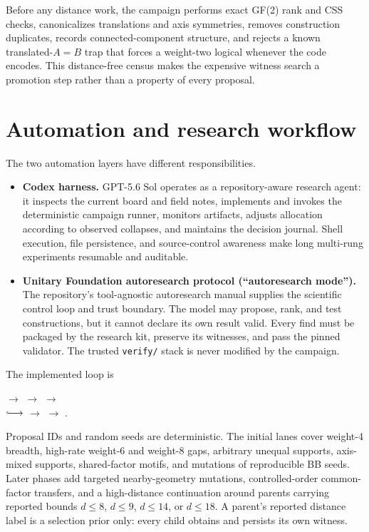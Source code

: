 \documentclass[11pt]{article}
\newcommand{\pathcode}[1]{\nolinkurl{#1}}
\begin{document}
Before any distance work, the campaign performs exact GF(2) rank and CSS
checks, canonicalizes translations and axis symmetries, removes construction
duplicates, records connected-component structure, and rejects a known
translated-$A=B$ trap that forces a weight-two logical whenever the code
encodes.  This distance-free census makes the expensive witness search a
promotion step rather than a property of every proposal.

\section{Automation and research workflow}

The two automation layers have different responsibilities.

\begin{itemize}
  \item \textbf{Codex harness.}  GPT-5.6 Sol operates as a repository-aware
  research agent: it inspects the current board and field notes, implements
  and invokes the deterministic campaign runner, monitors artifacts, adjusts
  allocation according to observed collapses, and maintains the decision
  journal.  Shell execution, file persistence, and source-control awareness
  make long multi-rung experiments resumable and auditable.

  \item \textbf{Unitary Foundation autoresearch protocol (``autoresearch
  mode'').}  The repository's tool-agnostic autoresearch manual supplies the
  scientific control loop and trust boundary.  The model may propose, rank,
  and test constructions, but it cannot declare its own result valid.  Every
  find must be packaged by the research kit, preserve its witnesses, and pass
  the pinned validator.  The trusted \pathcode{verify/} stack is never
  modified by the campaign.
\end{itemize}

The implemented loop is
\begin{center}
\small
{} $\longrightarrow$ 
$\longrightarrow$ 
$\longrightarrow$ \\[0.45em]
$\lhook\joinrel\longrightarrow$ 
$\longrightarrow$ 
$\longrightarrow$ .
\end{center}

Proposal IDs and random seeds are deterministic.  The initial lanes cover
weight-4 breadth, high-rate weight-6 and weight-8 gaps, arbitrary unequal
supports, axis-mixed supports, shared-factor motifs, and mutations of
reproducible BB seeds.  Later phases add targeted nearby-geometry mutations,
controlled-order common-factor transfers, and a high-distance continuation
around parents carrying reported bounds $d\leq8$, $d\leq9$, $d\leq14$, or
$d\leq18$.  A parent's reported distance label is a selection prior only:
every child obtains and persists its own witness.
\end{document}
